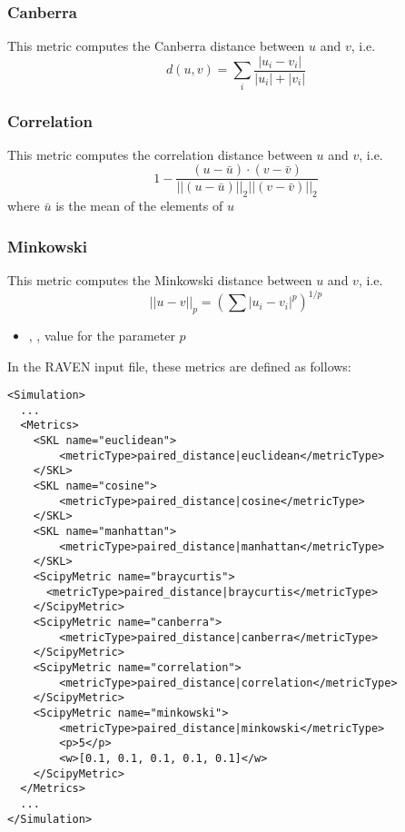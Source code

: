 \subsubsection{Canberra}
This metric computes the Canberra distance between $u$ and $v$, i.e.
\begin{equation}
  d(u,v) = \sum_i \frac{|u_i-v_i|}{|u_i|+|v_i|}
\end{equation}


\subsubsection{Correlation}
This metric computes the correlation distance between $u$ and $v$, i.e.
\begin{equation}
  1 - \frac{(u - \bar{u}) \cdot (v - \bar{v})}{{||(u - \bar{u})||}_2 {||(v - \bar{v})||}_2}
\end{equation}
where $\bar{u}$ is the mean of the elements of $u$


\subsubsection{Minkowski}
This metric computes the Minkowski distance between $u$ and $v$, i.e.
\begin{equation}
  {||u-v||}_p = (\sum{|u_i - v_i|^p})^{1/p}
\end{equation}


\begin{itemize}
  \item {}, , value for the parameter $p$
\end{itemize}

In the RAVEN input file, these metrics are defined as follows:
\begin{lstlisting}[style=XML]
<Simulation>
  ...
  <Metrics>
    <SKL name="euclidean">
        <metricType>paired_distance|euclidean</metricType>
    </SKL>
    <SKL name="cosine">
        <metricType>paired_distance|cosine</metricType>
    </SKL>
    <SKL name="manhattan">
        <metricType>paired_distance|manhattan</metricType>
    </SKL>
    <ScipyMetric name="braycurtis">
      <metricType>paired_distance|braycurtis</metricType>
    </ScipyMetric>
    <ScipyMetric name="canberra">
        <metricType>paired_distance|canberra</metricType>
    </ScipyMetric>
    <ScipyMetric name="correlation">
        <metricType>paired_distance|correlation</metricType>
    </ScipyMetric>
    <ScipyMetric name="minkowski">
        <metricType>paired_distance|minkowski</metricType>
        <p>5</p>
        <w>[0.1, 0.1, 0.1, 0.1, 0.1]</w>
    </ScipyMetric>
  </Metrics>
  ...
</Simulation>
\end{lstlisting}

